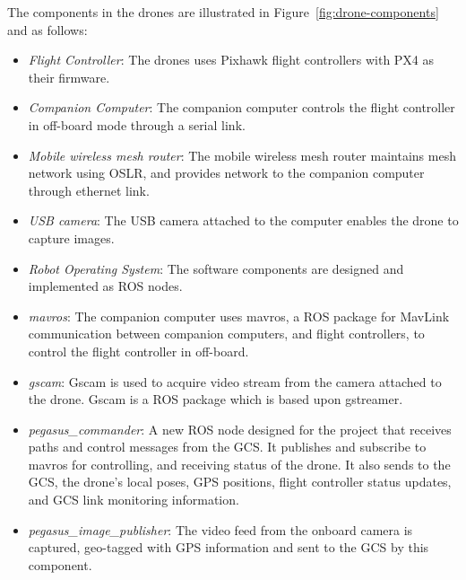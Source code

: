 The components in the drones are illustrated in Figure~\ref{fig:drone-components} and as follows:
\begin{itemize}
	\item \textit{Flight Controller}: The drones uses Pixhawk flight controllers with PX4 as their firmware.
	\item \textit{Companion Computer}: The companion computer controls the flight controller in off-board mode through a serial link.
	\item \textit{Mobile wireless mesh router}: The mobile wireless mesh router maintains mesh network using OSLR, and provides network to the companion computer through ethernet link.
	\item \textit{USB camera}: The USB camera attached to the computer enables the drone to capture images.
	\item \textit{Robot Operating System}: The software components are designed and implemented as ROS nodes.
	\item \textit{mavros}: The companion computer uses mavros, a ROS package for MavLink communication between companion computers, and flight controllers, to control the flight controller in off-board.
	\item \textit{gscam}:  Gscam is used to acquire video stream from the camera attached to the drone. Gscam is a ROS package which is based upon gstreamer.
	\item \textit{pegasus\_commander}: A new ROS node designed for the project that receives paths and control messages from the GCS. It publishes and subscribe to mavros for controlling, and receiving status of the drone. It also sends to the GCS, the drone's local poses, GPS positions, flight controller status updates, and GCS link monitoring information.
	\item \textit{pegasus\_image\_publisher}: The video feed from the onboard camera is captured, geo-tagged with GPS information and sent to the GCS by this component.
\end{itemize}


